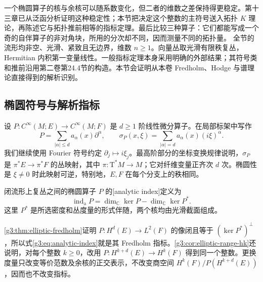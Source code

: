 
% 
% 
% 


一个椭圆算子的核与余核可以随系数变化，但二者的维数之差保持得更稳定。第十三章已从泛函分析证明这种稳定性；本节把决定这个整数的主符号送入拓扑 \(K\) 理论，再陈述它与拓扑推前相等的指标定理。最后比较三种算子：它们都能写成一个奇的自伴算子的非对角块，所用的分次却不同，因而测量不同的拓扑量。
\ProseParagraphBreak
全节的流形均非空、光滑、紧致且无边界，维数 \(n\ge1\)。向量丛取光滑有限秩复丛，Hermitian 内积第一变量线性。一般指标定理本身采用明确的外部结果；其符号类和推前沿用第二卷第24.4节的构造。本节会证明从本卷 Fredholm、Hodge 与谱理论直接得到的解析识别。

\subsection{椭圆符号与解析指标}
\label{g3:subsec:1704:01}
设 \(P:C^\infty(M;E)\to C^\infty(M;F)\) 是 \(d\ge1\) 阶线性微分算子。在局部标架中写作
\[
	P=\sum_{|\alpha|\le d}a_\alpha(x)\partial^\alpha,
	\qquad
	\sigma_P(x,\xi)=\sum_{|\alpha|=d}a_\alpha(x)(i\xi)^\alpha.
\]
我们继续使用 Fourier 符号约定 \(\partial_j\mapsto i\xi_j\)。最高阶部分的坐标变换规律说明，\(\sigma_P\) 是 \(\pi^*E\to\pi^*F\) 的丛映射，其中 \(\pi:\mathrm T^*M\to M\)；它对纤维变量正齐次 \(d\) 次。椭圆性是 \(\xi\ne0\) 时此映射可逆，特别地，\(E,F\) 在每个分支上的秩相同。

\begin{definition}\label{g3:def:analytic-index}
	闭流形上复丛之间的椭圆算子 \(P\) 的[analytic index]定义为
	\begin{equation}\label{g3:eq:analytic-index}
		\operatorname{ind}_{\mathrm a}P
		=\dim_{\mathbb C}\ker P-\dim_{\mathbb C}\ker P^*.
	\end{equation}
	这里 \(P^*\) 是所选密度和丛度量的形式伴随，两个核均由光滑截面组成。
\end{definition}

\cref{g3:thm:elliptic-fredholm}证明 \(P:H^d(E)\to L^2(F)\) 的像闭且等于 \((\ker P^*)^\perp\)，所以式\eqref{g3:eq:analytic-index}就是其 Fredholm 指标。\cref{g3:cor:elliptic-range-hk}还说明，对每个整数 \(k\ge0\)，改用 \(P:H^{k+d}(E)\to H^k(F)\) 得到同一个整数。更换度量只改变等价范数及余核的正交表示，不改变商空间 \(H^k(F)/P(H^{k+d}(E))\)，因而也不改变指标。

